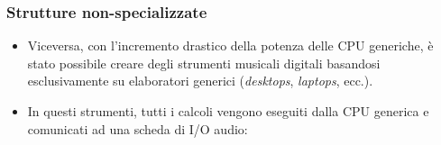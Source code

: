 \begin{frame}
    \frametitle{Strutture non-specializzate}

	\begin{itemize}[<+- | alert@+->]

		\item Viceversa, con l'incremento drastico della potenza
	      delle CPU generiche, \`e stato possibile creare
            degli strumenti musicali digitali
              basandosi esclusivamente su elaboratori
              generici (\emph{desktops}, \emph{laptops}, ecc.).

		\item In questi strumenti, tutti i calcoli vengono eseguiti
		      dalla CPU generica e comunicati ad una scheda di I/O audio:

	\end{itemize}


\end{frame}
